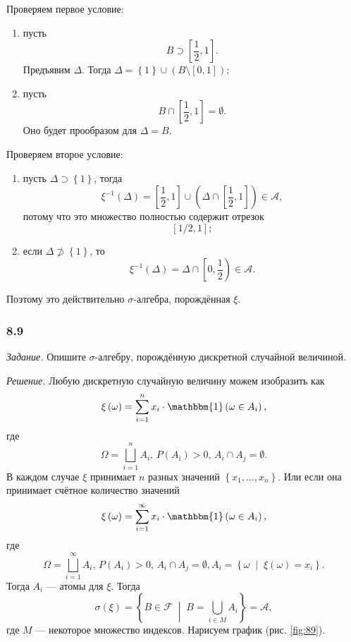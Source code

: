 \begin{enumerate}[label=\alph*)]
Проверяем первое условие:
\begin{enumerate}[label=\alph*)]
\item пусть
$$B \supset \left[ \frac{1}{2}, 1 \right].$$
Предъявим $ \Delta $.
Тогда $ \Delta = \left\{ 1 \right\} \cup \left( B \setminus \left[ 0, 1 \right] \right) $;
\item пусть
$$B \cap \left[ \frac{1}{2}, 1 \right] = \emptyset.$$
Оно будет прообразом для $ \Delta = B$.
\end{enumerate}

Проверяем второе условие:
\begin{enumerate}[label=\alph*)]
\item пусть $ \Delta \supset \left\{ 1 \right\} $, тогда
$$ \xi^{-1} \left( \Delta \right) =
\left[ \frac{1}{2}, 1 \right] \cup \left( \Delta \cap \left[ \frac{1}{2}, 1 \right] \right) \in
\mathcal{A},$$
потому что это множество полностью содержит отрезок
$$ \left[ 1/2, 1 \right];$$
\item если $ \Delta \not\supset \left\{ 1 \right\} $, то
$$ \xi^{-1} \left( \Delta \right) =
\Delta \cap \left[ 0, \frac{1}{2} \right) \in
\mathcal{A}.$$
\end{enumerate}

Поэтому это действительно $ \sigma $-алгебра, порождённая $ \xi $.
\end{enumerate}

\subsubsection*{8.9}

\textit{Задание.} Опишите $ \sigma $-алгебру, порождённую дискретной случайной величиной.

\textit{Решение.} Любую дискретную случайную величину можем изобразить как
$$ \xi \left( \omega \right) =
\sum \limits_{i=1}^n x_i \cdot \mathbbm{1} \left( \omega \in A_i \right),$$
где
$$ \Omega =
\bigsqcup \limits_{i=1}^n A_i, \,
P \left( A_i \right) >
0, \,
A_i \cap A_j =
\emptyset.$$
В каждом случае $ \xi $ принимает $n$ разных значений $ \left\{ x_1, \dotsc, x_n \right\} $.
Или если она принимает счётное количество значений
$$ \xi \left( \omega \right) =
\sum \limits_{i=1}^{ \infty } x_i \cdot \mathbbm{1} \left( \omega \in A_i \right),$$
где
$$ \Omega =
\bigsqcup \limits_{i=1}^{ \infty } A_i, \,
P \left( A_i \right) >
0, \,
A_i \cap A_j =
\emptyset,
A_i =
\left\{ \omega \; \middle| \; \xi \left( \omega \right) = x_i \right\}.$$
Тогда $A_i$ --- атомы для $ \xi $.
Тогда
$$ \sigma \left( \xi \right) =
\left\{ B \in \mathcal{F} \; \middle| \; B = \bigcup \limits_{i \in M} A_i \right\} =
\mathcal{A},$$
где $M$ --- некоторое множество индексов.
Нарисуем график (рис. \ref{fig:89}).

